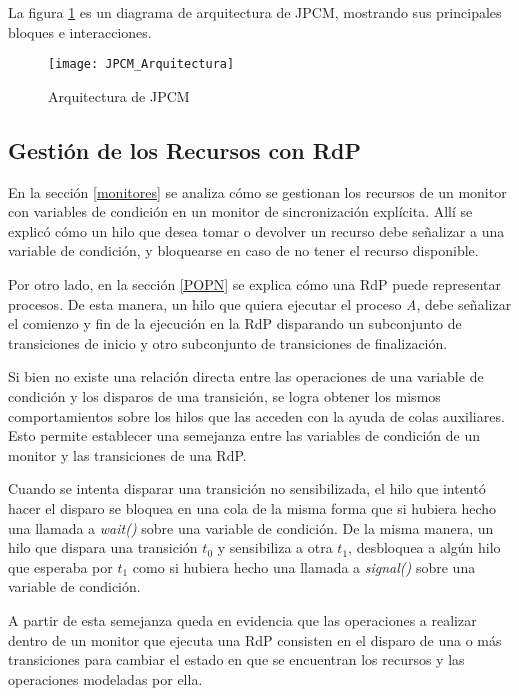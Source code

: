 La figura \ref{fig:JPCM_Arquitectura} es un diagrama de arquitectura de JPCM,
mostrando sus principales bloques e interacciones.

\begin{figure}[H]
  \centering
  \texttt{[image: JPCM\_Arquitectura]}
  \caption{Arquitectura de JPCM}
  \label{fig:JPCM_Arquitectura}
\end{figure}

\subsection{Gestión de los Recursos con RdP}
\label{JPCM_gestion_rec_rdp}
En la sección \ref{monitores} se analiza cómo se gestionan los recursos de un
monitor con variables de condición en un monitor de sincronización explícita.
Allí se explicó cómo un hilo que desea tomar o devolver un recurso debe
señalizar a una variable de condición, y bloquearse en caso de no tener el
recurso disponible.

Por otro lado, en la sección \ref{POPN} se explica cómo una RdP puede
representar procesos. De esta manera, un hilo que quiera ejecutar el proceso
\textit{A}, debe señalizar el comienzo y fin de la ejecución en la RdP
disparando un subconjunto de transiciones de inicio y otro subconjunto de
transiciones de finalización.
 
Si bien no existe una relación directa entre las operaciones de una variable de
condición y los disparos de una transición, se logra obtener los mismos
comportamientos sobre los hilos que las acceden con la ayuda de colas
auxiliares. Esto permite establecer una semejanza entre las variables de
condición de un monitor y las transiciones de una RdP.

Cuando se intenta disparar una transición no sensibilizada, el hilo que intentó
hacer el disparo se bloquea en una cola de la misma forma que si hubiera hecho
una llamada a \textit{wait()} sobre una variable de condición. De la misma
manera, un hilo que dispara una transición $t_{0}$ y sensibiliza a otra $t_{1}$,
desbloquea a algún hilo que esperaba por $t_{1}$ como si hubiera hecho una
llamada a \textit{signal()} sobre una variable de condición.

A partir de esta semejanza queda en evidencia que las operaciones a realizar
dentro de un monitor que ejecuta una RdP consisten en el disparo de una o más
transiciones para cambiar el estado en que se encuentran los recursos y las
operaciones modeladas por ella.

